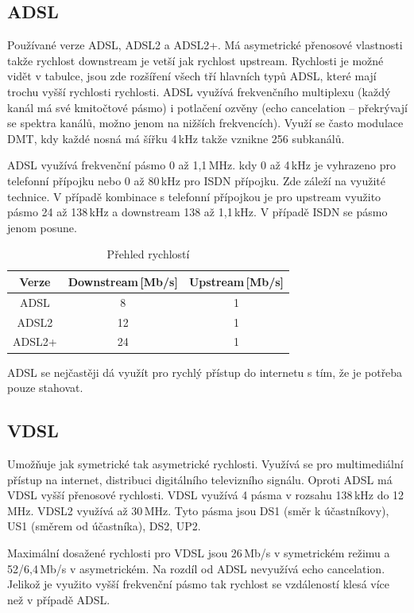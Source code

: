 \subsection{ADSL}

Používané verze ADSL, ADSL2 a ADSL2+.
Má asymetrické přenosové vlastnosti takže rychlost downstream je vetší jak rychlost upstream.
Rychlosti je možné vidět v tabulce, jsou zde rozšíření všech tří hlavních typů ADSL, které mají trochu vyšší rychlosti rychlosti. ADSL využívá frekvenčního multiplexu (každý kanál má své kmitočtové pásmo) i potlačení ozvěny (echo cancelation -- překrývají se spektra kanálů, možno jenom na nižších frekvencích). Využí se často modulace DMT, kdy každé nosná má šířku 4\,kHz takže vznikne 256 subkanálů.

ADSL využívá frekvenční pásmo 0 až 1,1\,MHz. kdy 0 až 4\,kHz je vyhrazeno pro telefonní přípojku nebo 0 až 80\,kHz pro ISDN přípojku. Zde záleží na využité technice. V případě kombinace s telefonní přípojkou je pro upstream využito pásmo 24 až 138\,kHz a downstream 138 až 1,1\,kHz. V případě ISDN se pásmo jenom posune. 

\begin{table}[ht]
    \centering
    \begin{tabular}{|c|c|c|}
    \hline
        Verze & Downstream\,[Mb/s] & Upstream\,[Mb/s] \\\hline
        ADSL  & 8 & 1 \\\hline
        ADSL2 & 12 & 1 \\\hline
        ADSL2+ & 24 & 1 \\\hline
    \end{tabular}
    \caption{Přehled rychlostí}
\end{table}

ADSL se nejčastěji dá využít pro rychlý přístup do internetu s tím, že je potřeba pouze stahovat.

\subsection{VDSL}

Umožňuje jak symetrické tak asymetrické rychlosti.
Využívá se pro multimediální přístup na internet, distribuci digitálního televizního signálu.
Oproti ADSL má VDSL vyšší přenosové rychlosti.
VDSL využívá 4 pásma v rozsahu 138\,kHz do 12\,MHz.
VDSL2 využívá až 30\,MHz.
Tyto pásma jsou DS1 (směr k účastníkovy), US1 (směrem od účastníka), DS2, UP2.

Maximální dosažené rychlosti pro VDSL jsou 26\,Mb/s v symetrickém režimu a 52/6,4\,Mb/s v asymetrickém.
Na rozdíl od ADSL nevyužívá echo cancelation.
Jelikož je využito vyšší frekvenční pásmo tak rychlost se vzdáleností klesá více než v případě ADSL.


